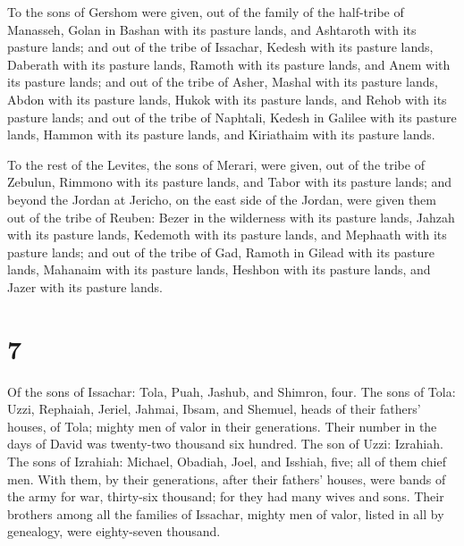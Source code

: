  To the sons of Gershom were given, out of the family of
the half-tribe of Manasseh, Golan in Bashan with its pasture lands, and
Ashtaroth with its pasture lands;  and out of the tribe of
Issachar, Kedesh with its pasture lands, Daberath with its pasture
lands,  Ramoth with its pasture lands, and Anem with its
pasture lands;  and out of the tribe of Asher, Mashal with
its pasture lands, Abdon with its pasture lands,  Hukok
with its pasture lands, and Rehob with its pasture lands; 
and out of the tribe of Naphtali, Kedesh in Galilee with its pasture
lands, Hammon with its pasture lands, and Kiriathaim with its pasture
lands.

 To the rest of the Levites, the sons of Merari, were
given, out of the tribe of Zebulun, Rimmono with its pasture lands, and
Tabor with its pasture lands;  and beyond the Jordan at
Jericho, on the east side of the Jordan, were given them out of the
tribe of Reuben: Bezer in the wilderness with its pasture lands, Jahzah
with its pasture lands,  Kedemoth with its pasture lands,
and Mephaath with its pasture lands;  and out of the tribe
of Gad, Ramoth in Gilead with its pasture lands, Mahanaim with its
pasture lands,  Heshbon with its pasture lands, and Jazer
with its pasture lands.

\hypertarget{section-6}{%
\section{7}\label{section-6}}

 Of the sons of Issachar: Tola, Puah, Jashub, and Shimron,
four.  The sons of Tola: Uzzi, Rephaiah, Jeriel, Jahmai,
Ibsam, and Shemuel, heads of their fathers' houses, of Tola; mighty men
of valor in their generations. Their number in the days of David was
twenty-two thousand six hundred.  The son of Uzzi: Izrahiah.
The sons of Izrahiah: Michael, Obadiah, Joel, and Isshiah, five; all of
them chief men.  With them, by their generations, after
their fathers' houses, were bands of the army for war, thirty-six
thousand; for they had many wives and sons.  Their brothers
among all the families of Issachar, mighty men of valor, listed in all
by genealogy, were eighty-seven thousand.

